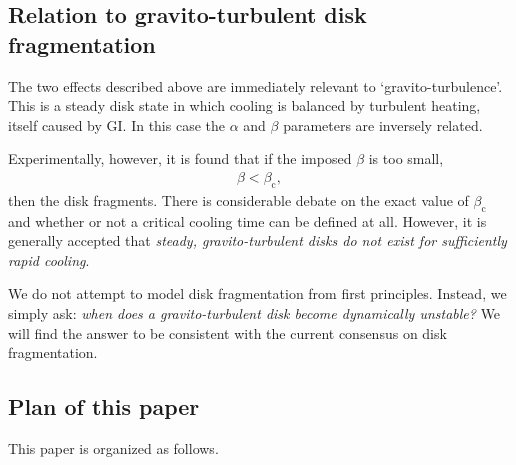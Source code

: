 \documentclass[iop, numberedappendix]{emulateapj}
\begin{document}

\subsection{Relation to gravito-turbulent disk fragmentation}%
The two effects described above are immediately relevant to
`gravito-turbulence'. This is a steady disk state in which cooling is
balanced by turbulent heating, itself caused by GI. In this case 
the $\alpha$ and $\beta$ parameters are inversely related.   

Experimentally, however, it is found that if the imposed $\beta$ is
too small, 
\begin{align}
  \beta < \beta_\mathrm{c},
\end{align}
then the disk fragments. There is considerable debate on the exact
value of $\beta_\mathrm{c}$ and whether or not a critical cooling time can
be defined at all. However, it is generally accepted that \emph{
  steady, gravito-turbulent disks do not exist for sufficiently rapid
cooling}. 

We do not attempt to model disk fragmentation from first
principles. Instead, we simply ask: \emph{when does a 
  gravito-turbulent disk become dynamically unstable?} 
We will find the answer to be consistent with the current consensus on
disk fragmentation. 












\subsection{Plan of this paper}

This paper is organized as follows. 








 


\appendix




\end{document}
